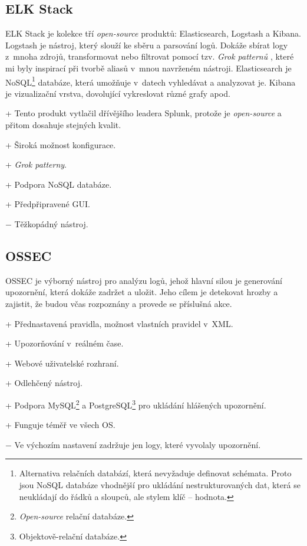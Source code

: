 \documentclass[thesis=B,czech]{FITthesis}[2012/06/26]
\begin{document}
\subsection{ELK Stack}
\label{elk}
ELK Stack je kolekce tří \textit{open-source} produktů: Elasticsearch, Logstash a Kibana. Logstash je nástroj, který slouží ke sběru a parsování logů. Dokáže sbírat logy z~mnoha zdrojů, transformovat nebo filtrovat pomocí tzv. \textit{Grok patternů} \cite{grok}, které mi byly inspirací při tvorbě aliasů v~mnou navrženém nástroji. 
Elasticsearch je NoSQL\footnote{Alternativa relačních databází, která nevyžaduje definovat schémata. Proto jsou NoSQL databáze vhodnější pro ukládání nestrukturovaných dat, která se neukládají do řádků a sloupců, ale stylem klíč -- hodnota.} databáze, která umožňuje v~datech vyhledávat a analyzovat je. Kibana je vizualizační vrstva, dovolující vykreslovat různé grafy apod. \cite{elkStack, openSourceLogging}

+ Tento produkt vytlačil dřívějšího leadera Splunk, protože je \textit{open-source} a přitom dosahuje stejných kvalit. 

+ Široká možnost konfigurace.

+ \textit{Grok patterny}.

+ Podpora NoSQL databáze.

+ Předpřipravené GUI.

$-$ Těžkopádný nástroj.

\subsection{OSSEC}
OSSEC je výborný nástroj pro analýzu logů, jehož hlavní silou je generování upozornění, která dokáže zadržet a uložit. Jeho cílem je detekovat hrozby a zajistit, že budou včas rozpoznány a provede se příslušná akce. \cite{logManagement}
	
+ Přednastavená pravidla, možnost vlastních pravidel v~XML.
	
+ Upozorňování v~reálném čase.
	
+ Webové uživatelské rozhraní.

+ Odlehčený nástroj.

+ Podpora MySQL\footnote{\textit{Open-source} relační databáze.} a PostgreSQL\footnote{Objektově-relační databáze.} pro ukládání hlášených upozornění. 
	
+ Funguje téměř ve všech OS.
	
$-$ Ve výchozím nastavení zadržuje jen logy, které vyvolaly upozornění. 
	
\end{document}
